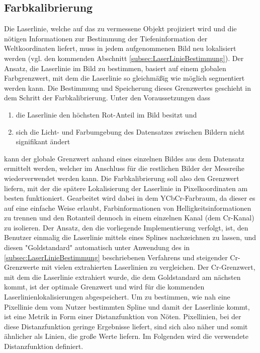 \subsection{Farbkalibrierung}
Die Laserlinie, welche auf das zu vermessene Objekt projiziert wird und die nötigen Informationen zur Bestimmung der Tiefeninformation der Weltkoordinaten liefert, muss in jedem aufgenommenen Bild neu lokalisiert werden (vgl. den kommenden Abschnitt \ref{subsec:LaserLinieBestimmung}). Der Ansatz, die Laserlinie im Bild zu bestimmen, basiert auf einem globalen Farbgrenzwert, mit dem die Laserlinie so gleichmäßig wie möglich segmentiert werden kann. Die Bestimmung und Speicherung dieses Grenzwertes geschieht in dem Schritt der Farbkalibrierung. Unter den Voraussetzungen dass 
\begin{enumerate}
\item die Laserlinie den höchsten Rot-Anteil im Bild besitzt und 
\item sich die Licht- und Farbumgebung des Datensatzes zwischen Bildern nicht signifikant ändert
\end{enumerate} 
kann der globale Grenzwert anhand eines einzelnen Bildes aus dem Datensatz ermittelt werden, welcher im Anschluss für die restlichen Bilder der Messreihe wiederverwendet werden kann. \newline
Die Farbkalibrierung soll also den Grenzwert liefern, mit der die spätere Lokalisierung der Laserlinie in Pixelkoordinaten am besten funktioniert. Gearbeitet wird dabei in dem YCbCr-Farbraum, da dieser es auf eine einfache Weise erlaubt, Farbinformationen von Helligkeitsinformationen zu trennen und den Rotanteil dennoch in einem einzelnen Kanal (dem Cr-Kanal) zu isolieren. Der Ansatz, den die vorliegende Implementierung verfolgt, ist, den Benutzer einmalig die Laserlinie mittels eines Splines nachzeichnen zu lassen, und diesen "Goldstandard" automatisch unter Anwendung des in \ref{subsec:LaserLinieBestimmung} beschriebenen Verfahrens und steigender Cr-Grenzwerte mit vielen extrahierten Laserlinien zu vergleichen. Der Cr-Grenzwert, mit dem die Laserlinie extrahiert wurde, die dem Goldstandard am nächsten kommt, ist der optimale Grenzwert und wird für die kommenden Laserlinienlokalisierungen abgespeichert.\newline
Um zu bestimmen, wie nah eine Pixellinie dem vom Nutzer bestimmten Spline und damit der Laserlinie kommt, ist eine Metrik in Form einer Distanzfunktion von Nöten. Pixellinien, bei der diese Distanzfunktion geringe Ergebnisse liefert, sind sich also 
näher und somit ähnlicher als Linien, die große Werte liefern. Im Folgenden wird die verwendete Distanzfunktion definiert.\newline
